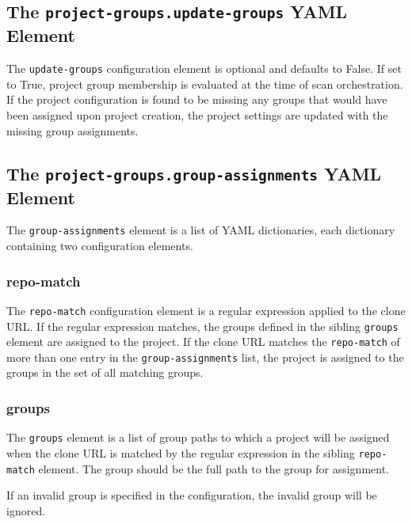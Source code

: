 \subsection{The \texttt{project-groups.update-groups} YAML Element}

The \texttt{update-groups} configuration element is optional and defaults to False.  If set to True,
project group membership is evaluated at the time of scan orchestration.  If the project configuration
is found to be missing any groups that would have been assigned upon project creation, the project settings
are updated with the missing group assignments.

\subsection{The \texttt{project-groups.group-assignments} YAML Element}

The \texttt{group-assignments} element is a list of YAML dictionaries, each dictionary containing
two configuration elements.

\subsubsection{repo-match}

The \texttt{repo-match} configuration element is a regular expression applied to the clone URL.  If the
regular expression matches, the groups defined in the sibling \texttt{groups} element are assigned
to the project.  If the clone URL matches the \texttt{repo-match} of more than one entry in the
\texttt{group-assignments} list, the project is assigned to the groups in the set of all matching groups.

\subsubsection{groups}

The \texttt{groups} element is a list of group paths to which a project will be assigned when the clone URL
is matched by the regular expression in the sibling \texttt{repo-match} element.  The group should be the full
path to the group for assignment.

If an invalid group is specified in the configuration, the invalid group will be ignored.

